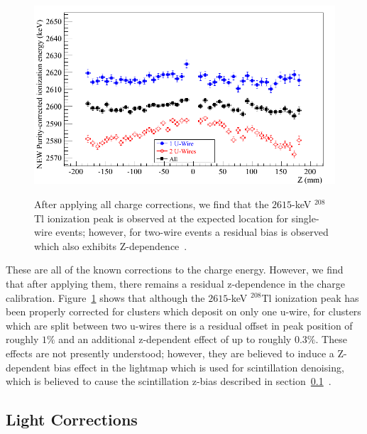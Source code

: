 \begin{figure}
\begin{center}
\includegraphics[keepaspectratio=true,width=\textwidth]{ResidualChargeZBias.png}
\end{center}
\renewcommand{\baselinestretch}{1}
\small\normalsize
\begin{quote}
\caption{After applying all charge corrections, we find that the $2615$-keV $^{208}$Tl ionization peak is observed at the expected location for single-wire events; however, for two-wire events a residual bias is observed which also exhibits Z-dependence~\cite{EnergyDocumentRun2ab}.}
\label{fig:ResidualChargeZBias}
\end{quote}
\end{figure}
\renewcommand{\baselinestretch}{2}
\small\normalsize

These are all of the known corrections to the charge energy.  However, we find that after applying them, there remains a residual z-dependence in the charge calibration.  Figure~\ref{fig:ResidualChargeZBias} shows that although the $2615$-keV $^{208}$Tl ionization peak has been properly corrected for clusters which deposit on only one u-wire, for clusters which are split between two u-wires there is a residual offset in peak position of roughly $1\%$ and an additional z-dependent effect of up to roughly $0.3\%$.  These effects are not presently understood; however, they are believed to induce a Z-dependent bias effect in the lightmap which is used for scintillation denoising, which is believed to cause the scintillation z-bias described in section~\ref{sec:ResultEnergyLight}~\cite{EnergyDocumentRun2ab}.

\subsection{Light Corrections}\label{sec:ResultEnergyLight}

